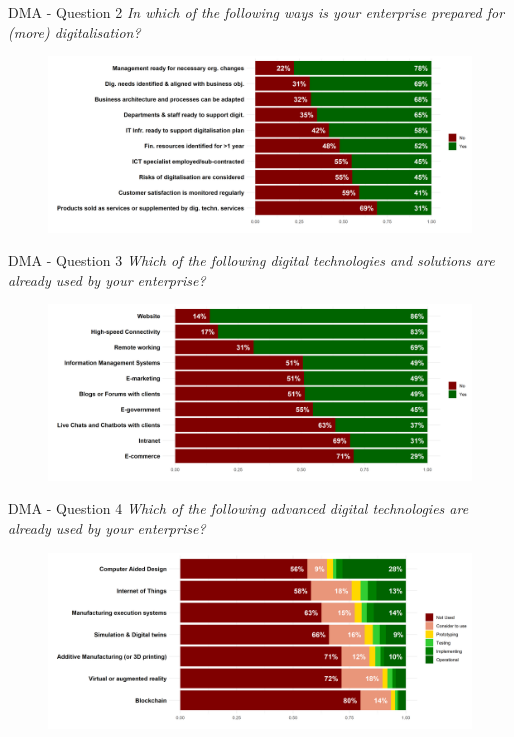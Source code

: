 \documentclass{beamer}
\begin{document}
    \begin{frame}{DMA - Question 2}
        \centering\textit{In which of the following ways is your enterprise prepared for (more) digitalisation?}
        \begin{figure}
            \centering
            \includegraphics[width=\textwidth]{../Output/q2.png}

        \end{figure}
    \end{frame}

    \begin{frame}{DMA - Question 3}
        \centering\textit{Which of the following digital technologies and solutions are already used by your enterprise?}
        \begin{figure}
            \centering
            \includegraphics[width=\textwidth]{../Output/q3.png}

        \end{figure}
    \end{frame}

    \begin{frame}{DMA - Question 4}
        \centering\textit{Which of the following advanced digital technologies are already used by your enterprise?}
        \begin{figure}
            \centering
            \includegraphics[width=\textwidth]{../Output/q4.png}

        \end{figure}
    \end{frame}
\end{document}
